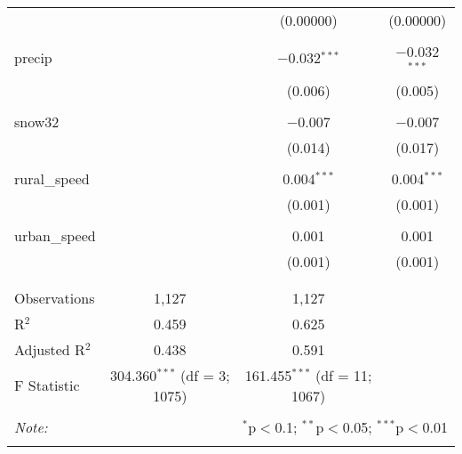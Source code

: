 \documentclass{article}
\begin{document}
\begin{table}[!htbp]
\begin{tabular}{@{\extracolsep{5pt}}lccc}
  &  & (0.00000) & (0.00000) \\ 
  & & & \\ 
 precip &  & $-$0.032$^{***}$ & $-$0.032$^{***}$ \\ 
  &  & (0.006) & (0.005) \\ 
  & & & \\ 
 snow32 &  & $-$0.007 & $-$0.007 \\ 
  &  & (0.014) & (0.017) \\ 
  & & & \\ 
 rural\_speed &  & 0.004$^{***}$ & 0.004$^{***}$ \\ 
  &  & (0.001) & (0.001) \\ 
  & & & \\ 
 urban\_speed &  & 0.001 & 0.001 \\ 
  &  & (0.001) & (0.001) \\ 
  & & & \\ 
\hline \\[-1.8ex] 
Observations & 1,127 & 1,127 &  \\ 
R$^{2}$ & 0.459 & 0.625 &  \\ 
Adjusted R$^{2}$ & 0.438 & 0.591 &  \\ 
F Statistic & 304.360$^{***}$ (df = 3; 1075) & 161.455$^{***}$ (df = 11; 1067) &  \\ 
\hline 
\hline \\[-1.8ex] 
\textit{Note:}  & \multicolumn{3}{r}{$^{*}$p$<$0.1; $^{**}$p$<$0.05; $^{***}$p$<$0.01} \\ 
\normalsize 
\end{tabular} 
\end{table} 
\end{document}

